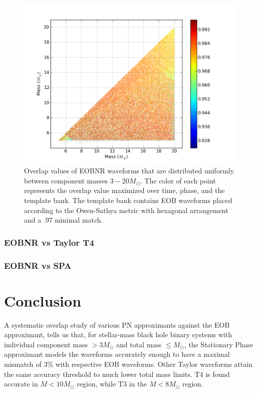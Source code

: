 \documentclass[aps,
prd,
amsmath,
amssymb,
twocolumn,
floatfix,
groupedaddress]{revtex4-1}
\begin{document}
\begin{figure}
\includegraphics[scale=0.04, clip=false, totalheight=0.3\textheight]{eobeobnr-bank.pdf}
\caption{\label{fig:eoboebnr-bank}Overlap values of EOBNR waveforms that are distributed uniformly between component 
masses $3 -20 M_{\odot}$. The color of each point represents the overlap value maximized over time, phase, and the
 template bank. The template bank contains EOB waveforms placed according to the Owen-Sathya metric with hexagonal arrangement
  and a .97 minimal match.}
\end{figure}

\subsubsection{EOBNR vs Taylor T4}


\subsubsection{EOBNR vs SPA}

\section{Conclusion}\label{sec:level1:Conclusion}

A systematic overlap study of various PN approximants against the EOB approximant, tells us that, for stellar-mass black hole binary systems with individual component mass $>3M_{\odot}$ and total mass $\leq M_{\odot}$, the Stationary Phase approximant models the waveforms accurately enough to have a maximal mismatch of $3\%$ with respective EOB waveforms. Other Taylor waveforms attain the same accuracy threshold to much lower total mass limits. T4 is found accurate in $M<10M_{\odot}$ region, while T3 in the $M<8M_{\odot}$ region. 
\end{document}
